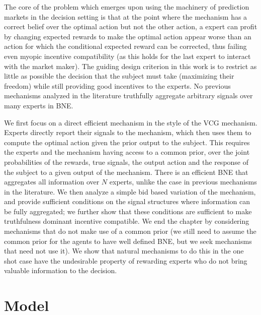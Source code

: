 The core of the problem which emerges upon using the machinery of prediction markets in the decision setting is that at the point where the mechanism has a correct belief over the optimal action but not the other action, a expert can profit by changing expected rewards to make the optimal action appear worse than an action for which the conditional expected reward can be corrected, thus failing even myopic incentive compatibility (as this holds for the last expert to interact with the market maker).
The guiding design criterion in this work is to restrict as little as possible the decision that the subject must take (maximizing their freedom) while still providing good incentives to the experts. No previous mechanisms analyzed in the literature truthfully aggregate arbitrary signals over many experts in BNE. 

We first focus on a direct efficient mechanism in the style of the VCG mechanism. Experts directly report their signals to the mechanism, which then uses them to compute the optimal action given the prior output to the subject. This requires the experts and the mechanism having access to a common prior, over the joint probabilities of the rewards, true signals, the output action and the response of the subject to a given output of the mechanism. There is an efficient BNE that aggregates all information over $N$ experts, unlike the case in previous mechanisms in the literature.
We then analyze a simple bid based variation of the mechanism, and provide sufficient conditions on the signal structures where information can be fully aggregated; we further show that these conditions are sufficient to make truthfulness dominant incentive compatible.  
We end the chapter by considering mechanisms that do not make use of a common prior (we still need to assume the common prior for the agents to have well defined BNE, but we seek mechanisms that need not use it). We show that natural mechanisms to do this in the one shot case have the undesirable property of rewarding experts who do not bring valuable information to the decision.

\section{Model}


